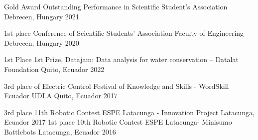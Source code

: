 



\begin{cvhonors}

  \cvhonor
    {Gold Award} %
    {Outstanding Performance in Scientific Student’s Association } %
    {Debrecen, Hungary} %
    {2021} %

  \cvhonor
    {1st place} %
    {Conference of Scientific Students’ Association Faculty of Engineering } %
    {Debrecen, Hungary} %
    {2020} %

\end{cvhonors}




\begin{cvhonors}

  \cvhonor
    {1st Place} %
    {1st Prize, Datajam: Data analysis for water conservation – Datalat Foundation} %
    {Quito, Ecuador} %
    {2022} %

    \cvhonor 
      {3rd place of Electric Control}
      {Festival of Knowledge and Skills - WordSkill Ecuador UDLA}
      {Quito, Ecuador}
      {2017}

    \cvhonor 
      {3rd place}
      {11th Robotic Contest ESPE Latacunga - Innovation Project}
      {Latacunga, Ecuador}
      {2017}
    \cvhonor
      {1st place}
      {10th Robotic Contest ESPE Latacunga- Minisumo Battlebots}
      {Latacunga, Ecuador}
      {2016}
\end{cvhonors}

